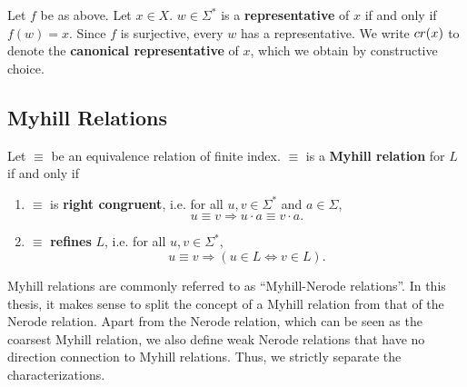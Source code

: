 
\begin{definition}
    Let $f$ be as above. 
    Let $x \in X$. $w \in \Sigma^*$ is a \textbf{representative} of $x$ if and only if $f(w) = x$.
    Since $f$ is surjective, every $w$ has a representative. 
    We write $cr(x)$ to denote the \textbf{canonical representative} of $x$, which we obtain by constructive choice.
\end{definition}




\subsection{Myhill Relations}

\begin{definition} 
    \label{Myhill}
    Let $\equiv$ be an equivalence relation of finite index. 
    $\equiv$ is a \textbf{Myhill relation} \cite{DBLP:books/daglib/0088160} for $L$ if and only if

\begin{enumerate}[label=(\roman*)]

    \item\label{right_congruent}
        $\equiv$ is \textbf{right congruent}, i.e. for all $u, v \in \Sigma^*$ and $a \in \Sigma$,
        \begin{equation*}
            u \equiv v \Rightarrow
            u \cdot a \equiv v \cdot a.
        \end{equation*}


    \item\label{refinement}
        $\equiv$ \textbf{refines} $L$, i.e. for all $u,v \in \Sigma^*$,
        \begin{equation*}
            u \equiv v \Rightarrow
            (u \in L \iff v \in L).
        \end{equation*}

\end{enumerate}
\end{definition}

Myhill relations are commonly referred to as ``Myhill-Nerode relations''. 
In this thesis, it makes sense to split the concept of a Myhill relation from that of the Nerode relation.
Apart from the Nerode relation, which can be seen as the coarsest Myhill relation, we also define
weak Nerode relations that have no direction connection to Myhill relations.
Thus, we strictly separate the characterizations.

